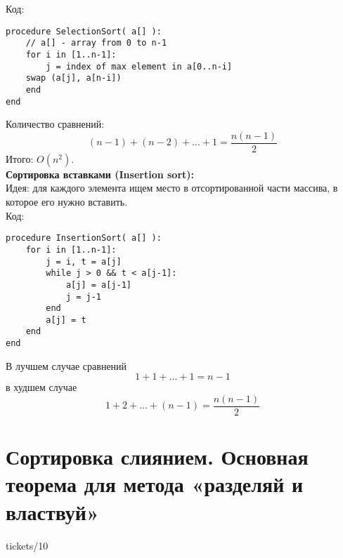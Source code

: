\documentclass[specialist, subf, href, colorlinks=true, 12pt, times, mtpro, final]{disser}
\begin{document}
Код:
\begin{verbatim}
procedure SelectionSort( a[] ):
    // a[] - array from 0 to n-1
    for i in [1..n-1]:
        j = index of max element in a[0..n-i]
    swap (a[j], a[n-i])
    end
end
\end{verbatim}
Количество сравнений:
$$
(n-1)+(n-2)+...+1 = \frac{n(n-1)}{2}
$$
Итого: $O(n^2)$.\\
{\bf Сортировка вставками (Insertion sort):}\\
Идея: для каждого элемента ищем место в отсортированной части массива, в которое его нужно вставить.\\
Код:
\begin{verbatim}
procedure InsertionSort( a[] ):
    for i in [1..n-1]:
        j = i, t = a[j]
        while j > 0 && t < a[j-1]:
            a[j] = a[j-1]
            j = j-1
        end
        a[j] = t
    end
end
\end{verbatim}
В лучшем случае сравнений
$$
1 + 1 + . . . + 1 = n - 1
$$
в худшем случае
$$
1 + 2 + . . . + (n - 1) = \frac{n(n - 1)}{2}
$$

\section {Сортировка слиянием. Основная теорема для метода «разделяй и властвуй»}
 {tickets/10}
 
\end{document}
